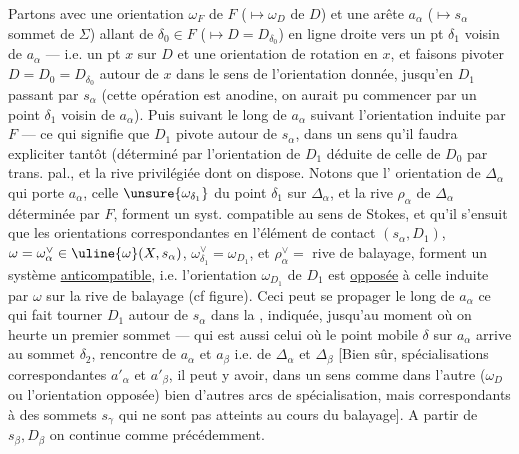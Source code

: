 Partons avec une orientation $\omega_F$ de
$F$ ($\mapsto\omega_D$ de $D$) et une
arête $a_\alpha$ ($\mapsto s_\alpha$ sommet de $\Sigma$)
allant de $\delta_0\in F$ ($\mapsto D=D_{\delta_0}$) en
ligne droite vers un pt $\delta_1$ voisin de
$a_\alpha$ --- i.e.  
un pt $x$ sur $D$ et une orientation
de rotation en $x$, et faisons pivoter
$D=D_0=D_{\delta_0}$ autour de $x$ dans le sens de
l'orientation donnée, jusqu'en $D_1$ passant
par $s_\alpha$ (cette opération est anodine,
on aurait pu commencer par un point
$\delta_1$ voisin de $a_\alpha$). Puis suivant le long de
$a_\alpha$ suivant l'orientation induite par $F$
--- ce qui signifie que $D_1$ pivote autour de
$s_\alpha$, dans un sens qu'il faudra expliciter
tantôt (déterminé par l'orientation de $D_1$ déduite
de celle de $D_0$ par trans. pal., et la rive
privilégiée dont on dispose. Notons que l'
orientation \inserted{$\omega_\alpha$} de $\Delta_\alpha$ qui porte $a_\alpha$, celle $\unsure{\omega_{\delta_1}}$ du point
$\delta_1$ sur $\Delta_\alpha$, et la rive $\rho_\alpha$ de $\Delta_\alpha$ déterminée
par $F$, forment un syst. compatible au sens de
Stokes, et qu'il s'ensuit que les
orientations correspondantes en l'élément de
contact $(s_\alpha,D_1)$, $\omega=\omega_\alpha^\vee\in\uline{\omega}(X,s_\alpha)$, $\omega_{\delta_1}^\vee=\omega_{D_1}$, et
$\rho_\alpha^\vee=$ rive de balayage, forment un système
\uline{anticompatible}, i.e. l'orientation $\omega_{D_1}$ de $D_1$
est \uline{opposée} à celle induite par $\omega$ sur la
rive de balayage (cf figure). Ceci peut 
se propager le long de $a_\alpha$  ce qui fait tourner
$D_1$ autour de $s_\alpha$ dans la ,
indiquée, jusqu'au moment où
on heurte un premier sommet
 --- qui est aussi celui où le
point mobile $\delta$ sur $a_\alpha$ arrive
au sommet $\delta_2$, rencontre de
 $a_\alpha$ et $a_\beta$ i.e. de $\Delta_\alpha$ et $\Delta_\beta$
[Bien sûr,  
spécialisations correspondantes $a'_\alpha$ et
$a'_\beta$, il peut y avoir, dans un
sens comme dans l'autre
($\omega_D$ ou l'orientation opposée) bien
d'autres arcs de spécialisation, mais
correspondants à des sommets $s_\gamma$
qui ne sont pas atteints au cours
du balayage]. A partir de $s_\beta,D_\beta$
on continue comme précédemment.
